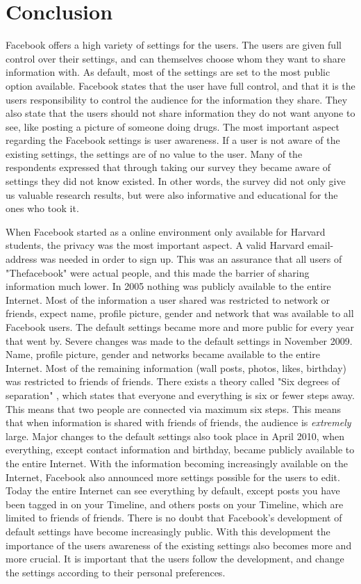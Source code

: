 \chapter{Conclusion}
\label{chp:conclusion} 

Facebook offers a high variety of settings for the users. The users are given full control over their settings, and can themselves choose whom they want to share information with. As default, most of the settings are set to the most public option available. Facebook states that the user have full control, and that it is the users responsibility to control the audience for the information they share. They also state that the users should not share information they do not want anyone to see, like posting a picture of someone doing drugs. The most important aspect regarding the Facebook settings is user awareness. If a user is not aware of the existing settings, the settings are of no value to the user. Many of the respondents expressed that through taking our survey they became aware of settings they did not know existed. In other words, the survey did not only give us valuable research results, but were also informative and educational for the ones who took it.  

When Facebook started as a online environment only available for Harvard students, the privacy was the most important aspect. A valid Harvard email-address was needed in order to sign up. This was an assurance that all users of "Thefacebook" were actual people, and this made the barrier of sharing information much lower. In 2005 nothing was publicly available to the entire Internet. Most of the information a user shared was restricted to network or friends, expect name, profile picture, gender and network that was available to all Facebook users. The default settings became more and more public for every year that went by. Severe changes was made to the default settings in November 2009. Name, profile picture, gender and networks became available to the entire Internet. Most of the remaining information (wall posts, photos, likes, birthday) was restricted to friends of friends. There exists a theory called "Six degrees of separation" \cite{six}, which states that everyone and everything is six or fewer steps away. This means that two people are connected via maximum six steps. This means that when information is shared with friends of friends, the audience is \textit{extremely} large. Major changes to the default settings also took place in April 2010, when everything, except contact information and birthday, became publicly available to the entire Internet. With the information becoming increasingly available on the Internet, Facebook also announced more settings possible for the users to edit. Today the entire Internet can see everything by default, except posts you have been tagged in on your Timeline, and others posts on your Timeline, which are limited to friends of friends. There is no doubt that Facebook's development of default settings have become increasingly public. With this development the importance of the users awareness of the existing settings also becomes more and more crucial. It is important that the users follow the development, and change the settings according to their personal preferences. 

